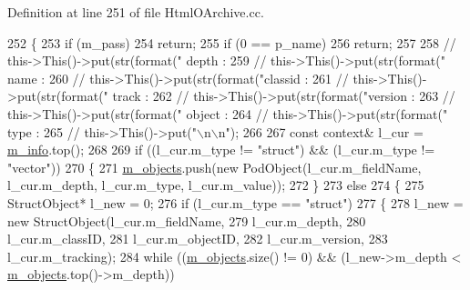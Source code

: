Definition at line 251 of file Html\+O\+Archive.\+cc.


\begin{DoxyCode}
252 \{
253   \textcolor{keywordflow}{if} (m\_pass)
254     \textcolor{keywordflow}{return};
255   \textcolor{keywordflow}{if} (0 == p\_name)
256     \textcolor{keywordflow}{return};
257 
258   \textcolor{comment}{//     this->This()->put(str(format("  depth : %
259   \textcolor{comment}{//     this->This()->put(str(format("   name : %
260   \textcolor{comment}{//     this->This()->put(str(format("classid : %
261   \textcolor{comment}{//     this->This()->put(str(format("  track : %
262   \textcolor{comment}{//     this->This()->put(str(format("version : %
263   \textcolor{comment}{//     this->This()->put(str(format(" object : %
264   \textcolor{comment}{//     this->This()->put(str(format("   type : %
265   \textcolor{comment}{//     this->This()->put("\(\backslash\)n\(\backslash\)n");}
266 
267   \textcolor{keyword}{const} context& l\_cur = \hyperlink{classxtd_1_1servers_1_1app_1_1HtmlOArchive_a03bd854507f8457a3b5b575203108ff7}{m\_info}.top();
268 
269   \textcolor{keywordflow}{if} ((l\_cur.m\_type != \textcolor{stringliteral}{"struct"}) && (l\_cur.m\_type != \textcolor{stringliteral}{"vector"}))
270   \{
271     \hyperlink{classxtd_1_1servers_1_1app_1_1HtmlOArchive_a69e333ff9b2b0743e14976cfa4afd6d2}{m\_objects}.push(\textcolor{keyword}{new} PodObject(l\_cur.m\_fieldName, l\_cur.m\_depth, l\_cur.m\_type, l\_cur.m\_value));
272   \}
273   \textcolor{keywordflow}{else}
274   \{
275     StructObject* l\_new = 0;
276     \textcolor{keywordflow}{if} (l\_cur.m\_type == \textcolor{stringliteral}{"struct"})
277     \{
278       l\_new = \textcolor{keyword}{new} StructObject(l\_cur.m\_fieldName,
279                                l\_cur.m\_depth,
280                                l\_cur.m\_classID,
281                                l\_cur.m\_objectID,
282                                l\_cur.m\_version,
283                                l\_cur.m\_tracking);
284       \textcolor{keywordflow}{while} ((\hyperlink{classxtd_1_1servers_1_1app_1_1HtmlOArchive_a69e333ff9b2b0743e14976cfa4afd6d2}{m\_objects}.size() != 0) && (l\_new->m\_depth < \hyperlink{classxtd_1_1servers_1_1app_1_1HtmlOArchive_a69e333ff9b2b0743e14976cfa4afd6d2}{m\_objects}.top()->m\_depth))
}}}}}}}
\end{DoxyCode}
